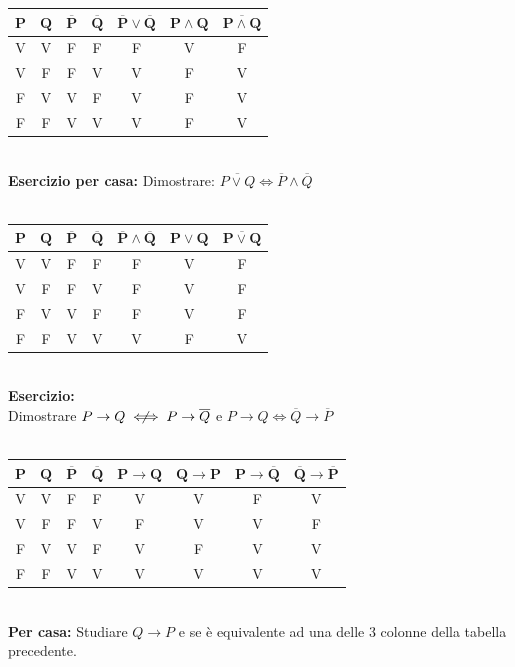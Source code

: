 \documentclass[12pt, letterpaper]{report}
\begin{document}
	\begin{tabular}{c|c|c|c|c|c|c}
		$\mathbf{P}$ & $\mathbf{Q}$ & $\mathbf{\overline P}$ & $\mathbf{\overline Q}$ & $\mathbf{\overline P \vee \overline Q}$ & $\mathbf{P \wedge Q}$ & $\mathbf{\overline{P \wedge Q}}$ \\
		\hline
		V & V & F & F & F & V & F\\
		V & F & F & V & V & F & V\\
		F & V & V & F & V & F & V\\
		F & F & V & V & V & F & V\\
	\end{tabular}
	\\
	\textbf{Esercizio per casa: }
	Dimostrare: $\overline{P \vee Q} \iff \overline P \wedge \overline Q$
	\\
	\\
	\begin{tabular}{c|c|c|c|c|c|c}
		$\mathbf{P}$ & $\mathbf{Q}$ & $\mathbf{\overline P}$ & $\mathbf{\overline Q}$ & $\mathbf{\overline P \wedge \overline Q}$ & $\mathbf{P \vee Q}$ & $\mathbf{\overline{P \vee Q}}$ \\
		\hline
		V & V & F & F & F & V & F \\
		V & F & F & V & F & V & F \\
		F & V & V & F & F & V & F \\
		F & F & V & V & V & F & V \\
	\end{tabular}
	\\
	\textbf{Esercizio: }
	\\
	Dimostrare $P \to Q \centernot \iff P \to \overline Q$ e $P \to Q \iff \overline Q \to \overline P$
	\\
	\\
	\begin{tabular}{c|c|c|c|c|c|c|c}
		$\mathbf{P}$ & $\mathbf{Q}$ & $\mathbf{\overline P}$ & $\mathbf{\overline Q}$ & $\mathbf{P \to Q}$ & $\mathbf{Q \to P}$ & $\mathbf{P \to \overline Q}$ & $\mathbf{\overline Q \to \overline P}$ \\
		\hline
		V & V & F & F & V & V & F & V\\
		V & F & F & V & F & V & V & F\\
		F & V & V & F & V & F & V & V\\
		F & F & V & V & V & V & V & V\\
	\end{tabular}
	\\
	\textbf{Per casa: } Studiare $Q \to P$ e se è equivalente ad una delle 3 colonne della tabella precedente.
\end{document}
